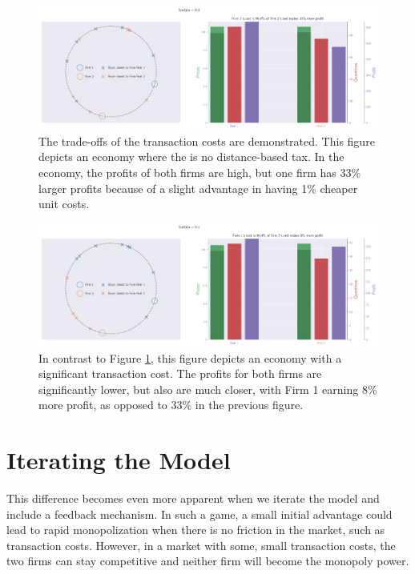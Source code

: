 \documentclass[final,5p,times,twocolumn,11pt]{elsarticle}
\numberwithin{equation}{section} %
\begin{document}
\begin{figure}[!htb]
	\centering
	\includegraphics[width=\textwidth/2]{no_tax.png}
	\caption{The trade-offs of the transaction costs are demonstrated.
		This figure depicts an economy where the is no distance-based tax. In the economy, the profits of both firms are high, but one firm has 33\% larger profits because of a slight advantage in having 1\% cheaper unit costs.}
	\label{fig:no_tax}
\end{figure}

\begin{figure}[!htb]
	\centering
	\includegraphics[width=\textwidth/2]{lambda=4Over10.png}
	\caption{
		In contrast to Figure \ref{fig:no_tax}, this figure depicts an economy with a significant transaction cost. The profits for both firms are significantly lower, but also are much closer, with Firm 1 earning 8\% more profit, as opposed to 33\% in the previous figure.}
	\label{fig:lambda=.4}
\end{figure}

\section{Iterating the Model}
This difference becomes even more apparent when we iterate the model and
include a feedback mechanism. In such a game, a small initial advantage could
lead to rapid monopolization when there is no friction in the market, such as
transaction costs. However, in a market with some, small transaction costs, the
two firms can stay competitive and neither firm will become the monopoly power.
\end{document}
